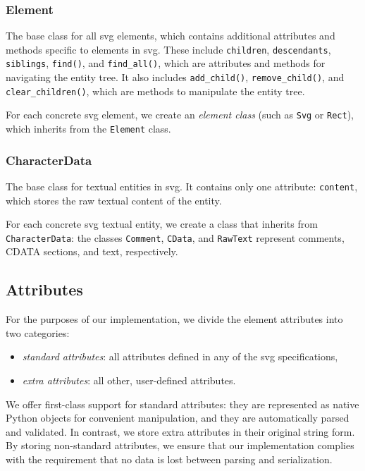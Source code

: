 \subsubsection{Element}

The base class for all \gls{svg} elements, which contains additional attributes and methods specific to elements in \gls{svg}. These include \texttt{children}, \texttt{descendants}, \texttt{siblings}, \texttt{find()}, and \texttt{find\_all()}, which are attributes and methods for navigating the entity tree. It also includes \texttt{add\_child()}, \texttt{remove\_child()}, and \texttt{clear\_children()}, which are methods to manipulate the entity tree.

For each concrete \gls{svg} element, we create an \emph{element class} (such as \texttt{Svg} or \texttt{Rect}), which inherits from the \texttt{Element} class.

\subsubsection{CharacterData}

The base class for textual entities in \gls{svg}. It contains only one attribute: \texttt{content}, which stores the raw textual content of the entity. 
    
For each concrete \gls{svg} textual entity, we create a class that inherits from \texttt{CharacterData}: the classes \texttt{Comment}, \texttt{CData}, and \texttt{RawText} represent comments, CDATA sections, and text, respectively.

\subsection{Attributes}

For the purposes of our implementation, we divide the element attributes into two categories:
\begin{itemize}
    \item \emph{standard attributes}: all attributes defined in any of the \gls{svg} specifications,
    \item \emph{extra attributes}: all other, user-defined attributes.
\end{itemize}

We offer first-class support for standard attributes: they are represented as native Python objects for convenient manipulation, and they are automatically parsed and validated. In contrast, we store extra attributes in their original string form. By storing non-standard attributes, we ensure that our implementation complies with the requirement that no data is lost between parsing and serialization.

